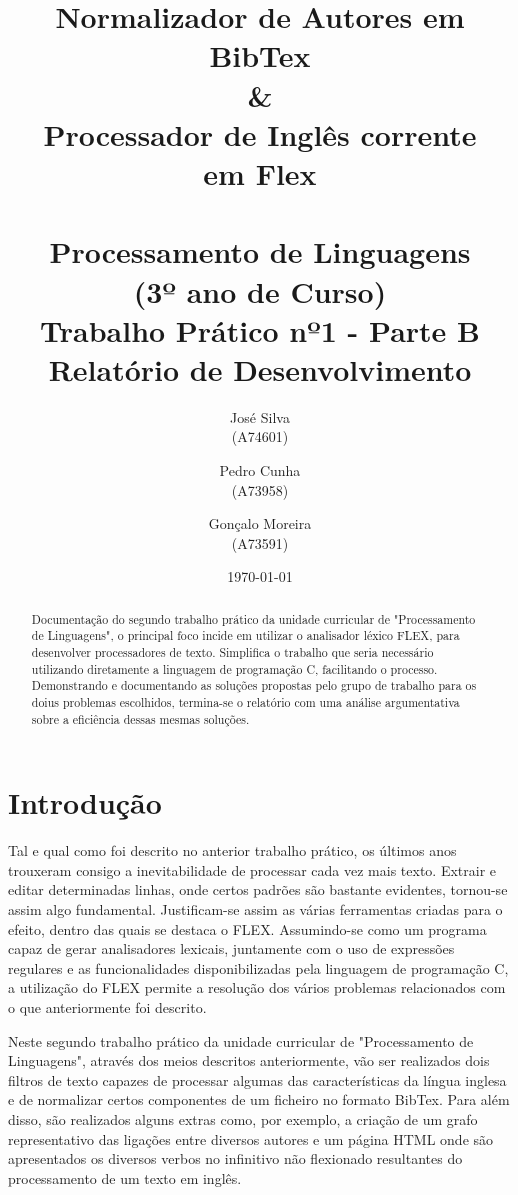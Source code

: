 \documentclass{report}
\title{ \textbf{Normalizador de Autores em BibTex}\\ 
\textbf{\&} \\
\textbf{Processador de Inglês corrente} \\ 
\textbf{em Flex} \\ \textbf{} \\
Processamento de Linguagens\\(3º ano de Curso)\\ 
\textbf{Trabalho Prático nº1 - Parte B}\\ Relatório de Desenvolvimento}
\author{José Silva\\ (A74601) \and Pedro Cunha\\ (A73958) \and Gonçalo Moreira\\ (A73591) }
\date{\today}
\begin{document}
\maketitle

\begin{abstract}
Documentação do segundo trabalho prático da unidade curricular de "Processamento de Linguagens", o principal foco incide em utilizar o analisador léxico FLEX, para desenvolver processadores de texto. 
Simplifica o trabalho que seria necessário utilizando diretamente a linguagem de programação C, facilitando o processo. 
Demonstrando e documentando as soluções propostas pelo grupo de trabalho para os doius problemas escolhidos, termina-se o relatório com uma análise argumentativa sobre a eficiência dessas mesmas soluções. 
\end{abstract}

\tableofcontents


\chapter{Introdução} \label{intro}
Tal e qual como foi descrito no anterior trabalho prático, os últimos anos trouxeram consigo a inevitabilidade de processar cada vez mais texto. Extrair e editar determinadas linhas, onde certos padrões são bastante evidentes, tornou-se assim algo fundamental. Justificam-se assim as várias ferramentas criadas para o efeito, dentro das quais se destaca o FLEX. Assumindo-se como um programa capaz de gerar analisadores lexicais, juntamente com o uso de expressões regulares e as funcionalidades disponibilizadas pela linguagem de programação C, a utilização do FLEX permite a resolução dos vários problemas relacionados com o que anteriormente foi descrito.


Neste segundo trabalho prático da unidade curricular de "Processamento de Linguagens", através dos meios descritos anteriormente,
vão ser realizados dois filtros de texto capazes de processar algumas das características da língua inglesa e de normalizar certos componentes de um ficheiro no formato BibTex. Para além disso, são realizados alguns extras como, por exemplo, a criação de um grafo representativo das ligações entre diversos autores e um página HTML onde são apresentados os diversos verbos no infinitivo não flexionado resultantes do processamento de um texto em inglês.
\end{document}

